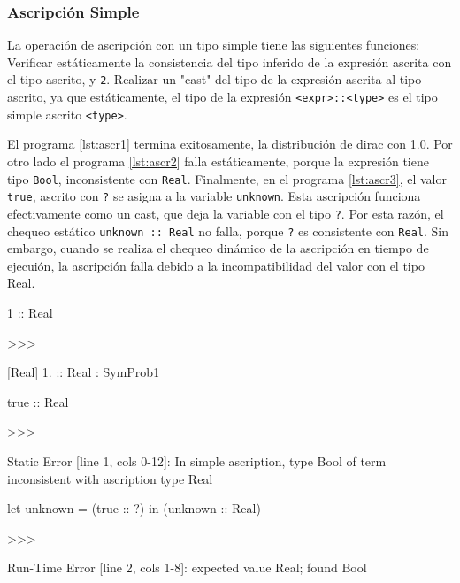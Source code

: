   
\subsubsection{Ascripción Simple}
La operación de ascripción con un tipo simple tiene
las siguientes funciones: Verificar estáticamente
la consistencia del tipo inferido de la expresión
ascrita con el tipo ascrito, y \lstinline|2|. Realizar un "cast"
del tipo de la expresión ascrita al tipo ascrito, ya
que estáticamente, el tipo de la expresión \lstinline|<expr>::<type>|
es el tipo simple ascrito \lstinline|<type>|.


El programa \ref{lst:ascr1} termina exitosamente,
la distribución de dirac con 1.0. Por otro lado
el programa \ref{lst:ascr2} falla estáticamente, porque
la expresión tiene tipo \lstinline|Bool|, inconsistente con
\lstinline|Real|. Finalmente, en el programa \ref{lst:ascr3}, el valor
\lstinline|true|, ascrito con \lstinline|?| se asigna a la variable
\lstinline|unknown|.  Esta ascripción funciona efectivamente
como un cast, que deja la variable con el tipo \lstinline|?|.
Por esta razón, el chequeo estático \lstinline|unknown :: Real|
no falla, porque \lstinline|?| es consistente con \lstinline|Real|.
Sin embargo, cuando se realiza el chequeo dinámico de
la ascripción en tiempo de ejecuión, la ascripción
falla debido a la incompatibilidad del valor con el
tipo Real.

\begin{gplcblock}[caption={ascr1},label={lst:ascr1}]
1 :: Real

>>>

{
	 [Real] 1. :: Real : SymProb1 
}  

\end{gplcblock}


\begin{gplcblock}[caption={ascr2},label={lst:ascr2}]
true :: Real

>>>

Static Error [line 1, cols 0-12]: In simple ascription, type Bool of term inconsistent with ascription type Real
\end{gplcblock}

\begin{gplcblock}[caption={ascr3},label={lst:ascr3}]
let unknown = (true :: ?) in
(unknown :: Real)

>>>

Run-Time Error [line 2, cols 1-8]: expected value Real; found Bool
\end{gplcblock}


